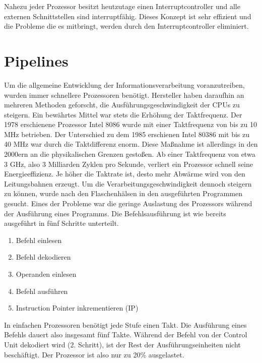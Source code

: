 \documentclass[a4paper,12pt]{article}
\begin{document}
\par\bigskip\noindent Nahezu jeder Prozessor besitzt heutzutage einen Interruptcontroller und alle externen Schnittstellen sind interruptfähig. Dieses Konzept ist sehr effizient und die Probleme die es mitbringt, werden durch den Interruptcontroller eliminiert.

\newpage
\section{Pipelines}
Um die allgemeine Entwicklung der Informationsverarbeitung voranzutreiben, wurden immer schnellere Prozessoren benötigt. Hersteller haben daraufhin an mehreren Methoden geforscht, die Ausführungsgeschwindigkeit der CPUs zu steigern. Ein bewährtes Mittel war stets die Erhöhung der Taktfrequenz. Der 1978 erschienene Prozessor Intel 8086 wurde mit einer Taktfrequenz von bis zu 10 MHz betrieben. Der Unterschied zu dem 1985 erschienen Intel 80386 mit bis zu 40 MHz war durch die Taktdifferenz enorm. Diese Maßnahme ist allerdings in den 2000ern an die physikalischen Grenzen gestoßen. Ab einer Taktfrequenz von etwa 3 GHz, also 3 Milliarden Zyklen pro Sekunde, verliert ein Prozessor schnell seine Energieeffizienz. Je höher die Taktrate ist, desto mehr Abwärme wird von den Leitungsbahnen erzeugt.
Um die Verarbeitungsgeschwindigkeit dennoch steigern zu können, wurde nach den Flaschenhälsen in den ausgeführten Programmen gesucht. Eines der  Probleme war die geringe Auslastung des Prozessors während der Ausführung eines Programms. Die Befehlsausführung ist wie bereits ausgeführt in fünf Schritte unterteilt.
\begin{enumerate}
\item Befehl einlesen
\item Befehl dekodieren
\item Operanden einlesen
\item Befehl ausführen 
\item Instruction Pointer inkrementieren (IP)
\end{enumerate}
In einfachen Prozessoren benötigt jede Stufe einen Takt. Die Ausführung eines Befehls dauert also insgesamt fünf Takte. Während der Befehl von der Control Unit dekodiert wird (2. Schritt), ist der Rest der Ausführungseinheiten nicht beschäftigt. Der Prozessor ist also nur zu 20\% ausgelastet. 
\end{document}
